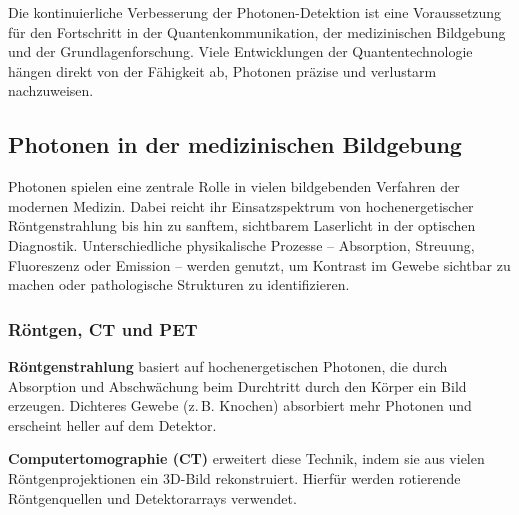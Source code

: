 \begin{tcolorbox}[hinweisbox, title=Hinweis zur Bedeutung der Detektionstechnologie]
	\label{box:detektionstechnologie}
	Die kontinuierliche Verbesserung der Photonen-Detektion ist eine Voraussetzung für den Fortschritt in der Quantenkommunikation, der medizinischen Bildgebung und der Grundlagenforschung. Viele Entwicklungen der Quantentechnologie hängen direkt von der Fähigkeit ab, Photonen präzise und verlustarm nachzuweisen.
\end{tcolorbox}

\subsection{Photonen in der medizinischen Bildgebung}

Photonen spielen eine zentrale Rolle in vielen bildgebenden Verfahren der modernen Medizin. Dabei reicht ihr Einsatzspektrum von hochenergetischer Röntgenstrahlung bis hin zu sanftem, sichtbarem Laserlicht in der optischen Diagnostik. Unterschiedliche physikalische Prozesse – Absorption, Streuung, Fluoreszenz oder Emission – werden genutzt, um Kontrast im Gewebe sichtbar zu machen oder pathologische Strukturen zu identifizieren.

\subsubsection{Röntgen, CT und PET}

\textbf{Röntgenstrahlung} basiert auf hochenergetischen Photonen, die durch Absorption und Abschwächung beim Durchtritt durch den Körper ein Bild erzeugen. Dichteres Gewebe (z.\,B. Knochen) absorbiert mehr Photonen und erscheint heller auf dem Detektor.

\textbf{Computertomographie (CT)} erweitert diese Technik, indem sie aus vielen Röntgenprojektionen ein 3D-Bild rekonstruiert. Hierfür werden rotierende Röntgenquellen und Detektorarrays verwendet.

